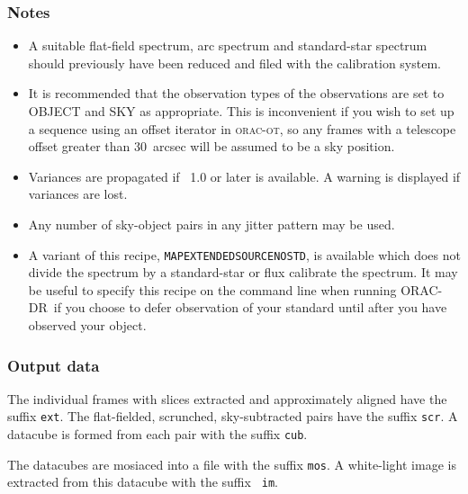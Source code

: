 \documentclass[twoside,11pt]{article}
\newcommand{\xref}[3]{#1}
\renewcommand{\_}{\texttt{\symbol{95}}}
\newcommand{\KAPPA}{\xref{{\sc{Kappa}}}{sun95}{}}
\newcommand{\ORACDR}{{\footnotesize ORAC-DR}}
\begin{document}
\subsubsection*{Notes}\begin{itemize}
\item 
  
  A suitable flat-field spectrum, arc spectrum and standard-star
  spectrum should previously have been reduced and filed with the
  calibration system.

\item 

It is recommended that the observation types of the observations are set
to OBJECT and SKY as appropriate. This is inconvenient if you wish to
set up a sequence using an offset iterator in \textsc{orac-ot}, so any frames
with a telescope offset greater than 30~arcsec will be assumed to be a
sky position.

\item 

Variances are propagated if \KAPPA\ 1.0 or later is available. A warning
is displayed if variances are lost.

\item 

Any number of sky-object pairs in any jitter pattern may be used.

\item
A variant of this recipe, {\tt MAP\_EXTENDED\_SOURCE\_NOSTD}, is
available which does not divide the spectrum by a standard-star or
flux calibrate the spectrum. It may be useful to specify this recipe
on the command line when running \ORACDR\ if you choose to defer
observation of your standard until after you have observed your
object.

\end{itemize}

\subsubsection*{Output data}

The individual frames with slices extracted and approximately aligned
have the suffix {\tt \_ext}. The flat-fielded, scrunched,
sky-subtracted pairs have the suffix {\tt \_scr}. A datacube is
formed from each pair with the suffix {\tt \_cub}.

The datacubes are mosiaced into a file with the suffix {\tt \_mos}. A
white-light image is extracted from this datacube with the suffix {\tt
  \_im}.
\end{document}
